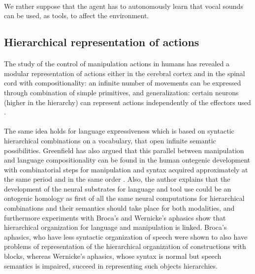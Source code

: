 \documentclass[12pt]{article}
\begin{document}
		\paragraph{}
		We rather suppose that the agent has to autonomously learn that vocal sounds can be used, as tools, to affect the environment.
		

	
	\subsection{Hierarchical representation of actions}
	
		\paragraph{}
		The study of the control of manipulation actions in humans has revealed a modular representation of actions 
		either in the cerebral cortex and in the spinal 
		cord with compositionality: an infinite number of movements can be expressed through combination of simple primitives, 
		and generalization: certain neurons (higher 
		in the hierarchy) can represent actions independently of the effectors used \cite{cangelosi2010integration}.
		
		\paragraph{}
		The same idea holds for language expressiveness which is based on syntactic hierarchical combinations 
		on a vocabulary, that open infinite semantic possibilities. 
		Greenfield has also argued that this parallel between manipulation and language compositionality can be found in the human ontegenic development
		with combinatorial steps for manipulation and syntax acquired approximately at the same period and in the same order \cite{green}. 
		Also, the author explains that the development of the neural substrates for language and tool use could be an ontogenic homology as first of all
		the same neural computations for hierarchical combinations and their semantics should take place for both modalities, and furthermore 
		experiments with Broca's and Wernicke's aphasics show that hierarchical organization for language and manipulation is linked. 
		Broca's aphasics, who have less syntactic organization of speech were shown to also have problems of representation of the hierarchical organization
		of constructions with blocks, whereas Wernicke's aphasics, whose syntax is normal but speech semantics is impaired, succeed in representing such objects 
		hierarchies. 
		
\end{document}
